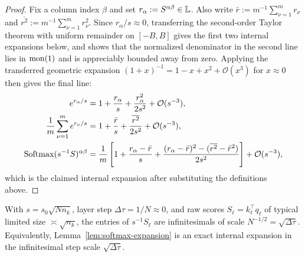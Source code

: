 \begin{proof}
Fix a column index $\beta$ and set $r_\alpha := S^{\alpha\beta} \in \mathbb{L}$. Also write $\bar{r} := m^{-1}\sum_{\nu=1}^m r_\nu$ and $\overline{r^2} := m^{-1}\sum_{\nu=1}^m r_\nu^2$. Since $r_\alpha / s \approx 0$, transferring the second-order Taylor theorem with uniform remainder on $[-B, B]$ gives the first two internal expansions below, and shows that the normalized denominator in the second line lies in $\operatorname{mon}(1)$ and is appreciably bounded away from zero. Applying the transferred geometric expansion $(1 + x)^{-1} = 1 - x + x^2 + \mathcal{O}(x^3)$ for $x \approx 0$ then gives the final line:
\begin{equation}
\label{eq:ch6-softmax-proof-steps}
\begin{aligned}
e^{r_\alpha / s} &= 1 + \frac{r_\alpha}{s} + \frac{r_\alpha^2}{2s^2} + \mathcal{O}(s^{-3}), \\
\frac{1}{m}\sum_{\nu=1}^m e^{r_\nu / s} &= 1 + \frac{\bar{r}}{s} + \frac{\overline{r^2}}{2s^2} + \mathcal{O}(s^{-3}), \\
\operatorname{Softmax}(s^{-1} S)^{\alpha\beta} &= \frac{1}{m}\left[1 + \frac{r_\alpha - \bar{r}}{s} + \frac{(r_\alpha - \bar{r})^2 - (\overline{r^2} - \bar{r}^2)}{2s^2}\right] + \mathcal{O}(s^{-3}),
\end{aligned}
\end{equation}
which is the claimed internal expansion after substituting the definitions above.
\end{proof}

With $s = s_0 \sqrt{N n_k}$, layer step $\Delta\tau = 1/N \approx 0$, and raw scores $S_\ell = k_\ell^\top q_\ell$ of typical limited size $\asymp \sqrt{n_k}$, the entries of $s^{-1} S_\ell$ are infinitesimals of scale $N^{-1/2} = \sqrt{\Delta\tau}$. Equivalently, Lemma~\ref{lem:softmax-expansion} is an exact internal expansion in the infinitesimal step scale $\sqrt{\Delta\tau}$.

